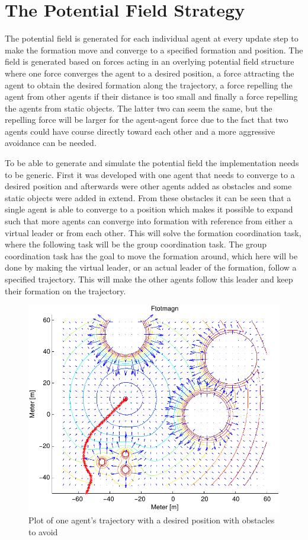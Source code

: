 \documentclass[a4paper,conference]{IEEEtran}
\begin{document}
\section{The Potential Field Strategy}
 The potential field is
generated for each individual agent at every update step to make the
formation move and converge to a specified formation and position. The
field is generated based on forces acting in an overlying potential
field structure where one force converges the agent to a desired
position, a force attracting the agent to obtain the desired formation
along the trajectory, a force repelling the agent from other agents if
their distance is too small and finally a force repelling the agents
from static objects. The latter two can seem the same, but the
repelling force will be larger for the agent-agent force due to the
fact that two agents could have course directly toward each other and
a more aggressive avoidance can be needed.

To be able to generate and simulate the potential field the
implementation needs to be generic. First it was developed with one
agent that needs to converge to a desired position and afterwards were
other agents added as obstacles and some static objects were added in
extend. From these obstacles it can be seen that a single agent is
able to converge to a position which makes it possible to expand such
that more agents can converge into formation with reference from
either a virtual leader or from each other. This will solve the
formation coordination task, where the following task will be the
group coordination task. The group coordination task has the goal to
move the formation around, which here will be done by making the
virtual leader, or an actual leader of the formation, follow a
specified trajectory. This will make the other agents follow this
leader and keep their formation on the trajectory.

\begin{figure}[htbp]
  \includegraphics[width=\linewidth]{fig/ftotmagnfigpdf1}
	\caption{Plot of one agent's trajectory with a desired position with
		obstacles to avoid}
  \label{fig:potfieldagenti}
\end{figure}
\end{document}
